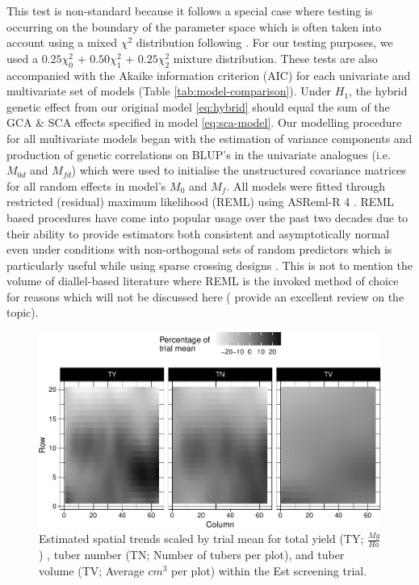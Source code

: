 This test is non-standard because it follows a special case where testing is occurring on the boundary of the parameter space which is often taken into account using a mixed \(\chi^2\) distribution following \parencite{Self1987}. For our testing purposes, we used a \(0.25\chi^2_0\) + \(0.50\chi^2_1\) + \(0.25\chi^2_2\) mixture distribution. These tests are also accompanied with the Akaike information criterion (AIC) for each univariate and multivariate set of models (Table \ref{tab:model-comparison}). Under \(H_1\), the hybrid genetic effect from our original model \eqref{eq:hybrid} should equal the sum of the GCA \& SCA effects specified in model \eqref{eq:sca-model}. Our modelling procedure for all multivariate models began with the estimation of variance components and production of genetic correlations on BLUP's in the univariate analogues (i.e.~\(M_{0d}\) and \(M_{fd}\)) which were used to initialise the unstructured covariance matrices for all random effects in model's \(M_0\) and \(M_f\). All models were fitted through restricted (residual) maximum likelihood (REML) using ASReml-R 4 \parencite{Butler2017}. REML based procedures have come into popular usage over the past two decades due to their ability to provide estimators both consistent and asymptotically normal even under conditions with non-orthogonal sets of random predictors which is particularly useful while using sparse crossing designs \parencite{Searle1992}. This is not to mention the volume of diallel-based literature where REML is the invoked method of choice for reasons which will not be discussed here (\parencite{Mohring2011} provide an excellent review on the topic).

\begin{figure}
\centering
\includegraphics[width=\linewidth]{./figs_02/Fig1.pdf}
\caption{\label{fig:trend-est}Estimated spatial trends scaled by trial mean for total yield (TY; \(\frac{Mg}{Ha}\)) , tuber number (TN; Number of tubers per plot), and tuber volume (TV; Average \(cm^3\) per plot) within the Est screening trial.}
\end{figure}


